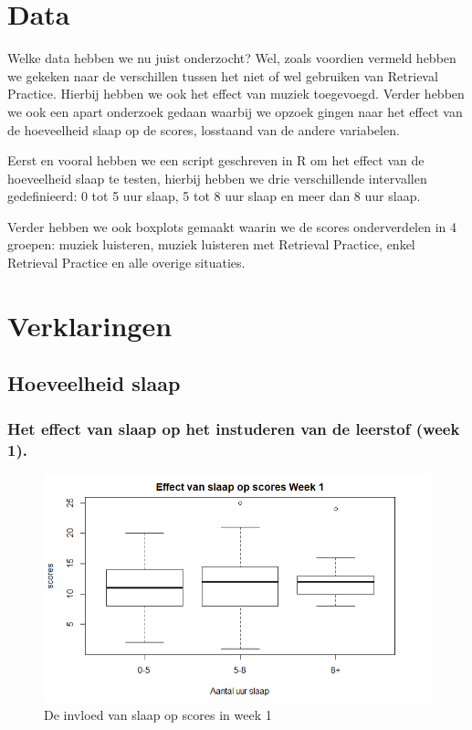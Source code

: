 \documentclass{hogent-article}
\begin{document}
\section{Data}

Welke data hebben we nu juist onderzocht? Wel, zoals voordien vermeld hebben we gekeken naar de verschillen tussen het niet of wel gebruiken van Retrieval Practice. Hierbij hebben we ook het effect van muziek toegevoegd. Verder hebben we ook een apart onderzoek gedaan waarbij we opzoek gingen naar het effect van de hoeveelheid slaap op de scores, losstaand van de andere variabelen.\\
\par
\noindent
Eerst en vooral hebben we een script geschreven in R om het effect van de hoeveelheid slaap te testen, hierbij hebben we drie verschillende intervallen gedefinieerd: 0 tot 5 uur slaap, 5 tot 8 uur slaap en meer dan 8 uur slaap.\\
\par
\noindent
Verder hebben we ook boxplots gemaakt waarin we de scores onderverdelen in 4 groepen: muziek luisteren, muziek luisteren met Retrieval Practice, enkel Retrieval Practice en alle overige situaties.

\section{Verklaringen}

\subsection{Hoeveelheid slaap}

\subsubsection{Het effect van slaap op het instuderen van de leerstof (week 1).}

\begin{figure}[H]
	\includegraphics[width=\linewidth]{slaapGraph1}
    \caption{De invloed van slaap op scores in week 1}
\end{figure}
\end{document}
